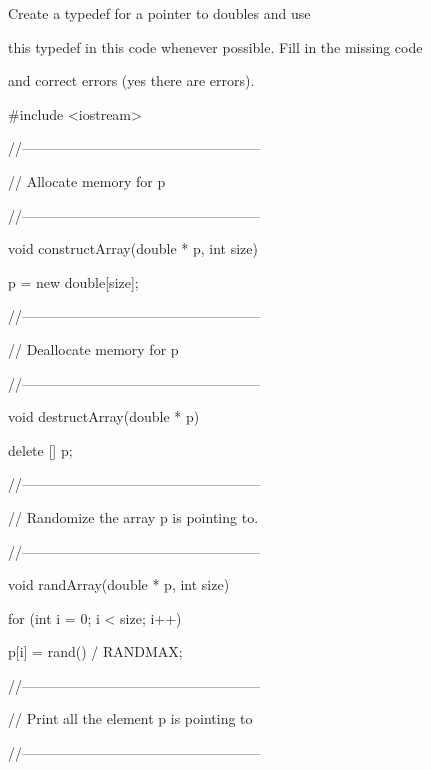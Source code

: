 Create a typedef for a pointer to doubles and use

this typedef in this code whenever possible. Fill in the missing code

and correct errors (yes there are errors).



\begin{consolethree}[escapeinside=||]

#include <iostream>



//---------------------------------------------------

// Allocate memory for p

//---------------------------------------------------

void constructArray(double * p, int size)

{

    p = new double[size];

}



//---------------------------------------------------

// Deallocate memory for p

//---------------------------------------------------

void destructArray(double * p)

{

    delete [] p;

}



//---------------------------------------------------

// Randomize the array p is pointing to.

//---------------------------------------------------

void randArray(double * p, int size)

{

    for (int i = 0; i < size; i++)

    {

        p[i] = rand() / RANDMAX;

    }

}



//---------------------------------------------------

// Print all the element p is pointing to

//---------------------------------------------------


\end{consolethree}
